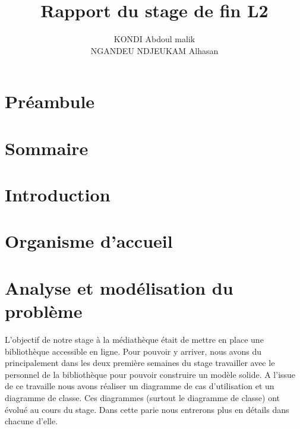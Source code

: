 \documentclass[12pt,a4paper]{article}
\author{KONDI Abdoul malik \\ NGANDEU NDJEUKAM Alhasan}
\title{Rapport du stage de fin L2}
\begin{document}
\maketitle
\tableofcontents
\newpage
\section{Préambule}
\section{Sommaire}
\section{Introduction}
\section{Organisme d'accueil}
\newpage
\section{Analyse et modélisation du problème}
L'objectif de notre stage à la médiathèque était de mettre en place une bibliothèque accessible en ligne. Pour pouvoir y arriver, nous avons du principalement dans les deux première semaines du stage travailler avec le personnel de la bibliothèque pour pouvoir construire un modèle solide. A l'issue 
de ce travaille nous avons réaliser un diagramme de cas d'utilisation et un 
diagramme de classe. Ces diagrammes (surtout le diagramme de classe) ont évolué
au cours du stage. Dans cette parie nous entrerons plus en détails dans chacune 
d'elle.
\end{document}
